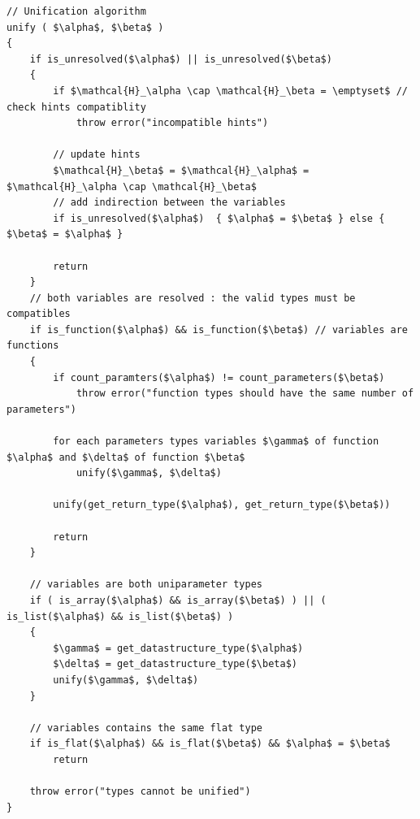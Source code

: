 \documentclass[a4paper,11pt]{article}
\begin{document}
\begin{center}
\begin{minipage}{0.75\linewidth}
\begin{lstlisting}[mathescape,caption={Unification algorithm},label={lst:unification}]
// Unification algorithm
unify ( $\alpha$, $\beta$ )
{
	if is_unresolved($\alpha$) || is_unresolved($\beta$)
	{
		if $\mathcal{H}_\alpha \cap \mathcal{H}_\beta = \emptyset$ // check hints compatiblity
			throw error("incompatible hints")

	 	// update hints
	 	$\mathcal{H}_\beta$ = $\mathcal{H}_\alpha$ = $\mathcal{H}_\alpha \cap \mathcal{H}_\beta$
		// add indirection between the variables
		if is_unresolved($\alpha$)	{ $\alpha$ = $\beta$ } else { $\beta$ = $\alpha$ }

		return
	}
	// both variables are resolved : the valid types must be compatibles
	if is_function($\alpha$) && is_function($\beta$) // variables are functions
	{
		if count_paramters($\alpha$) != count_parameters($\beta$)
			throw error("function types should have the same number of parameters")

		for each parameters types variables $\gamma$ of function $\alpha$ and $\delta$ of function $\beta$
			unify($\gamma$, $\delta$)

		unify(get_return_type($\alpha$), get_return_type($\beta$))

		return
	}

	// variables are both uniparameter types
	if ( is_array($\alpha$) && is_array($\beta$) ) || ( is_list($\alpha$) && is_list($\beta$) )
	{
		$\gamma$ = get_datastructure_type($\alpha$)
		$\delta$ = get_datastructure_type($\beta$)
		unify($\gamma$, $\delta$)
	}

	// variables contains the same flat type
	if is_flat($\alpha$) && is_flat($\beta$) && $\alpha$ = $\beta$
		return

	throw error("types cannot be unified")
}
\end{lstlisting}
\end{minipage}
\end{center}
\end{document}

